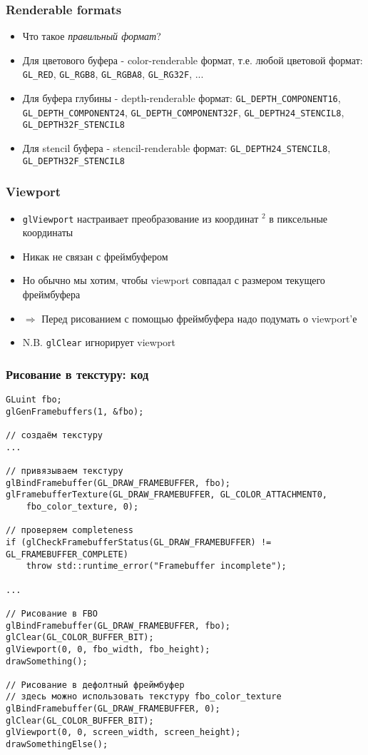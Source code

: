 \documentclass{beamer}
\begin{document}
\begin{frame}[fragile]
\frametitle{Renderable formats}
\begin{itemize}
\item Что такое \textit{правильный формат}?
\pause
\item Для цветового буфера - color-renderable формат, т.е. любой цветовой формат: \verb|GL_RED|, \verb|GL_RGB8|, \verb|GL_RGBA8|, \verb|GL_RG32F|, ...
\pause
\item Для буфера глубины - depth-renderable формат: \verb|GL_DEPTH_COMPONENT16|, \verb|GL_DEPTH_COMPONENT24|, \verb|GL_DEPTH_COMPONENT32F|, \verb|GL_DEPTH24_STENCIL8|, \verb|GL_DEPTH32F_STENCIL8|
\pause
\item Для stencil буфера - stencil-renderable формат: \verb|GL_DEPTH24_STENCIL8|, \verb|GL_DEPTH32F_STENCIL8|
\end{itemize}
\end{frame}

\begin{frame}[fragile]
\frametitle{Viewport}
\begin{itemize}
\item \verb|glViewport| настраивает преобразование из координат \begin{math}[-1, 1]^2\end{math} в пиксельные координаты
\pause
\item Никак не связан с фреймбуфером
\pause
\item Но обычно мы хотим, чтобы viewport совпадал с размером текущего фреймбуфера
\pause
\item \begin{math}\Rightarrow\end{math} Перед рисованием с помощью фреймбуфера надо подумать о viewport'е
\pause
\item N.B. \verb|glClear| игнорирует viewport
\end{itemize}
\end{frame}

\begin{frame}[fragile]
\frametitle{Рисование в текстуру: код}
\fontsize{8pt}{8pt}
\begin{verbatim}
GLuint fbo;
glGenFramebuffers(1, &fbo);

// создаём текстуру
...

// привязываем текстуру
glBindFramebuffer(GL_DRAW_FRAMEBUFFER, fbo);
glFramebufferTexture(GL_DRAW_FRAMEBUFFER, GL_COLOR_ATTACHMENT0,
    fbo_color_texture, 0);

// проверяем completeness
if (glCheckFramebufferStatus(GL_DRAW_FRAMEBUFFER) != GL_FRAMEBUFFER_COMPLETE)
    throw std::runtime_error("Framebuffer incomplete");

...

// Рисование в FBO
glBindFramebuffer(GL_DRAW_FRAMEBUFFER, fbo);
glClear(GL_COLOR_BUFFER_BIT);
glViewport(0, 0, fbo_width, fbo_height);
drawSomething();

// Рисование в дефолтный фреймбуфер
// здесь можно использовать текстуру fbo_color_texture
glBindFramebuffer(GL_DRAW_FRAMEBUFFER, 0);
glClear(GL_COLOR_BUFFER_BIT);
glViewport(0, 0, screen_width, screen_height);
drawSomethingElse();
\end{verbatim}
\end{frame}
\end{document}
